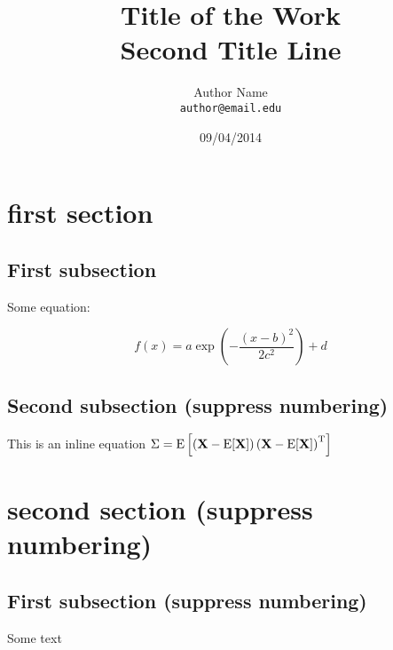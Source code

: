 \documentclass{report}
\title{Title of the Work\\ Second Title Line}
\author{Author Name\\ \texttt{author@email.edu}}
\date{09\slash 04\slash 2014}
\begin{document}

\maketitle %



\section{first section}



\subsection{First subsection}

Some equation:

\begin{equation} f(x) = a \exp{\left(- { \frac{(x-b)^2 }{ 2 c^2} } \right)}+d \end{equation}




\subsection*{Second subsection (suppress numbering)}

This is an inline equation 
$\Sigma=\mathrm{E}
\left[
 \left(
 \textbf{X} - \mathrm{E}[\textbf{X}]
 \right)
 \left(
 \textbf{X} - \mathrm{E}[\textbf{X}]
 \right)^{\rm T}
\right]$

\newpage

\section*{second section (suppress numbering)}

\subsection*{First subsection (suppress numbering)}

Some text
\end{document}
